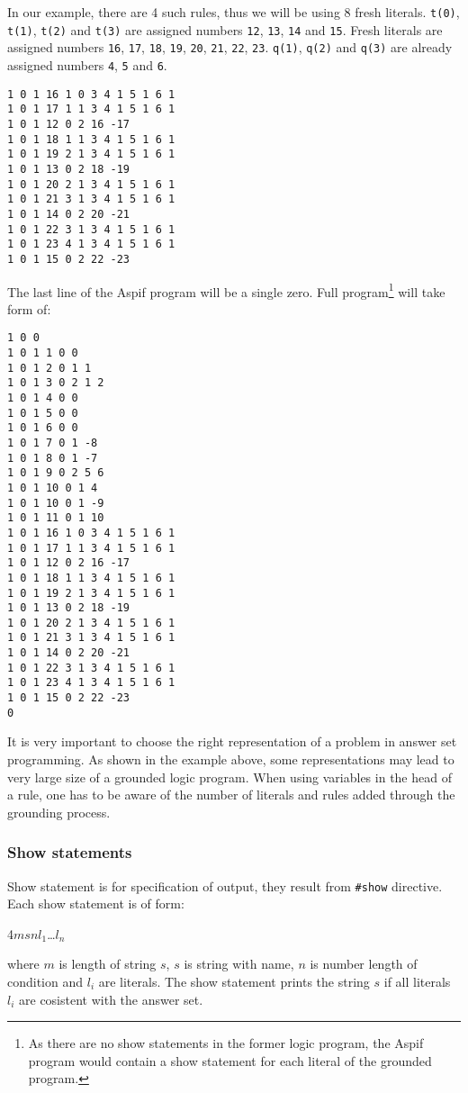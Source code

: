 \begin{example}
    In our example, there are 4 such rules, thus we will be using 8 fresh literals.
    \texttt{t(0)}, \texttt{t(1)}, \texttt{t(2)} and \texttt{t(3)} are
    assigned numbers \texttt{12}, \texttt{13}, \texttt{14} and \texttt{15}.
    Fresh literals are assigned numbers 
    \texttt{16}, \texttt{17}, \texttt{18}, \texttt{19},
    \texttt{20}, \texttt{21}, \texttt{22}, \texttt{23}.
    \texttt{q(1)}, \texttt{q(2)} and \texttt{q(3)} are already assigned numbers
    \texttt{4}, \texttt{5} and \texttt{6}.
    \begin{lstlisting}[firstnumber=14]
1 0 1 16 1 0 3 4 1 5 1 6 1
1 0 1 17 1 1 3 4 1 5 1 6 1
1 0 1 12 0 2 16 -17
1 0 1 18 1 1 3 4 1 5 1 6 1
1 0 1 19 2 1 3 4 1 5 1 6 1
1 0 1 13 0 2 18 -19
1 0 1 20 2 1 3 4 1 5 1 6 1
1 0 1 21 3 1 3 4 1 5 1 6 1
1 0 1 14 0 2 20 -21
1 0 1 22 3 1 3 4 1 5 1 6 1
1 0 1 23 4 1 3 4 1 5 1 6 1
1 0 1 15 0 2 22 -23
\end{lstlisting}

    The last line of the Aspif program will be a single zero.
    Full program\footnote{
        As there are no show statements in the former logic program,
        the Aspif program would contain a show statement for each literal
        of the grounded program.
    } will take form of:
    \begin{lstlisting}
1 0 0
1 0 1 1 0 0
1 0 1 2 0 1 1
1 0 1 3 0 2 1 2
1 0 1 4 0 0
1 0 1 5 0 0
1 0 1 6 0 0
1 0 1 7 0 1 -8
1 0 1 8 0 1 -7
1 0 1 9 0 2 5 6
1 0 1 10 0 1 4
1 0 1 10 0 1 -9
1 0 1 11 0 1 10
1 0 1 16 1 0 3 4 1 5 1 6 1
1 0 1 17 1 1 3 4 1 5 1 6 1
1 0 1 12 0 2 16 -17
1 0 1 18 1 1 3 4 1 5 1 6 1
1 0 1 19 2 1 3 4 1 5 1 6 1
1 0 1 13 0 2 18 -19
1 0 1 20 2 1 3 4 1 5 1 6 1
1 0 1 21 3 1 3 4 1 5 1 6 1
1 0 1 14 0 2 20 -21
1 0 1 22 3 1 3 4 1 5 1 6 1
1 0 1 23 4 1 3 4 1 5 1 6 1
1 0 1 15 0 2 22 -23
0
\end{lstlisting}
\end{example}

It is very important to choose the right representation of a problem
in answer set programming. As shown in the example above, some representations
may lead to very large size of a grounded logic program.
When using variables in the head of a rule, one has to be aware
of the number of literals and rules added through the grounding process.

\subsubsection{Show statements}

Show statement is for specification of output, they result from \texttt{\#show}
directive. Each show statement is of form:
\begin{center}
    4\ms{}$m$\ms{}$s$\ms{}$n$\ms{}$l_1$\ms{}\dots\ms$l_n$
\end{center}
where $m$ is length of string $s$, $s$ is string
with name, $n$ is number length of condition and $l_i$ are literals.
The show statement prints the string $s$ if all literals $l_i$ are cosistent
with the answer set.

